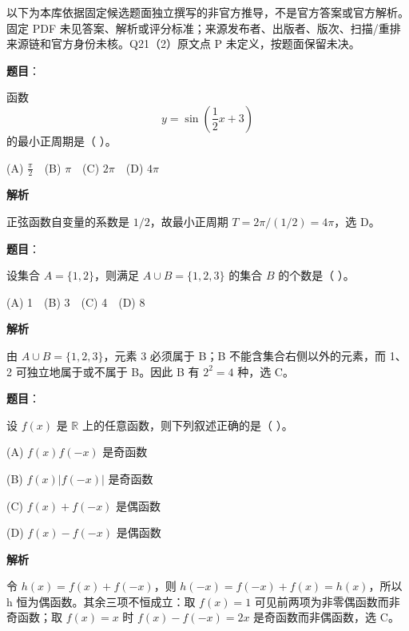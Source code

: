

\begin{gktip}
以下为本库依据固定候选题面独立撰写的非官方推导，不是官方答案或官方解析。固定 PDF 未见答案、解析或评分标准；来源发布者、出版者、版次、扫描/重排来源链和官方身份未核。Q21（2）原文点 P 未定义，按题面保留未决。
\end{gktip}

\begin{answer}

\textbf{题目}：

函数
\nopagebreak[4]
\[
y=\sin\left(\frac12x+3\right)
\]
的最小正周期是（ ）。

(A) \(\frac{\pi}{2}\)　(B) \(\pi\)　(C) \(2\pi\)　(D) \(4\pi\)

\textbf{解析}

正弦函数自变量的系数是 $1/2$，故最小正周期 $T=2\pi/(1/2)=4\pi$，选 D。


\end{answer}
\begin{answer}

\textbf{题目}：

设集合 \(A=\{1,2\}\)，则满足 \(A\cup B=\{1,2,3\}\) 的集合 \(B\) 的个数是（ ）。

(A) 1　(B) 3　(C) 4　(D) 8

\textbf{解析}

由 $A\cup B=\{1,2,3\}$，元素 3 必须属于 B；B 不能含集合右侧以外的元素，而 1、2 可独立地属于或不属于 B。因此 B 有 $2^2=4$ 种，选 C。


\end{answer}
\begin{answer}

\textbf{题目}：

设 \(f(x)\) 是 \(\mathbb R\) 上的任意函数，则下列叙述正确的是（ ）。

(A) \(f(x)f(-x)\) 是奇函数

(B) \(f(x)|f(-x)|\) 是奇函数

(C) \(f(x)+f(-x)\) 是偶函数

(D) \(f(x)-f(-x)\) 是偶函数

\textbf{解析}

令 $h(x)=f(x)+f(-x)$，则 $h(-x)=f(-x)+f(x)=h(x)$，所以 h 恒为偶函数。其余三项不恒成立：取 $f(x)=1$ 可见前两项为非零偶函数而非奇函数；取 $f(x)=x$ 时 $f(x)-f(-x)=2x$ 是奇函数而非偶函数，选 C。


\end{answer}
